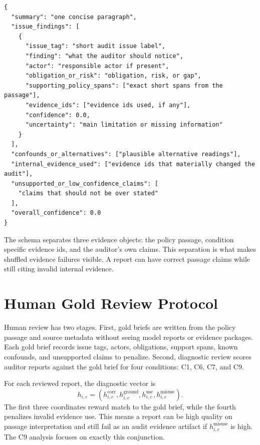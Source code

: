 \documentclass{article}
\begin{document}
\begin{verbatim}
{
  "summary": "one concise paragraph",
  "issue_findings": [
    {
      "issue_tag": "short audit issue label",
      "finding": "what the auditor should notice",
      "actor": "responsible actor if present",
      "obligation_or_risk": "obligation, risk, or gap",
      "supporting_policy_spans": ["exact short spans from the passage"],
      "evidence_ids": ["evidence ids used, if any"],
      "confidence": 0.0,
      "uncertainty": "main limitation or missing information"
    }
  ],
  "confounds_or_alternatives": ["plausible alternative readings"],
  "internal_evidence_used": ["evidence ids that materially changed the audit"],
  "unsupported_or_low_confidence_claims": [
    "claims that should not be over stated"
  ],
  "overall_confidence": 0.0
}
\end{verbatim}

The schema separates three evidence objects: the policy passage, condition specific evidence ids, and the auditor's own claims. This separation is what makes shuffled evidence failures visible. A report can have correct passage claims while still citing invalid internal evidence.

\section{Human Gold Review Protocol}

Human review has two stages. First, gold briefs are written from the policy passage and source metadata without seeing model reports or evidence packages. Each gold brief records issue tags, actors, obligations, support spans, known confounds, and unsupported claims to penalize. Second, diagnostic review scores auditor reports against the gold brief for four conditions: C1, C6, C7, and C9.

For each reviewed report, the diagnostic vector is
\begin{equation}
h_{i,c}=(h^{\mathrm{corr}}_{i,c},h^{\mathrm{ground}}_{i,c},h^{\mathrm{use}}_{i,c},h^{\mathrm{misuse}}_{i,c}).
\end{equation}
The first three coordinates reward match to the gold brief, while the fourth penalizes invalid evidence use. This means a report can be high quality on passage interpretation and still fail as an audit evidence artifact if $h^{\mathrm{misuse}}_{i,c}$ is high. The C9 analysis focuses on exactly this conjunction.
\end{document}

